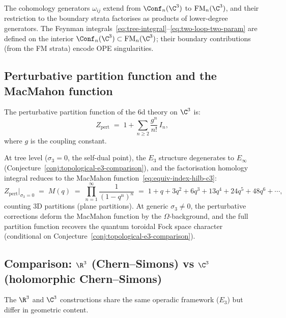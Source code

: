 The cohomology generators $\omega_{ij}$ extend from $\Conf_n(\C^3)$ to $\mathrm{FM}_n(\C^3)$, and their restriction to the boundary strata factorises as products of lower-degree generators. The Feynman integrals~\eqref{eq:tree-integral}--\eqref{eq:two-loop-two-param} are defined on the interior $\Conf_n(\C^3) \subset \mathrm{FM}_n(\C^3)$; their boundary contributions (from the FM strata) encode OPE singularities.


\subsection{Perturbative partition function and the MacMahon function}
\label{subsec:pert-part-fn}

The perturbative partition function of the $6$d theory on $\C^3$ is:
\begin{equation}\label{eq:z-pert-c3}
 Z_{\mathrm{pert}} \;=\; 1 + \sum_{n \geq 2} \frac{g^n}{n!} \, I_n,
\end{equation}
where $g$ is the coupling constant.

At tree level ($\sigma_3 = 0$, the self-dual point), the $E_3$ structure degenerates to $E_\infty$ (Conjecture~\ref{conj:topological-e3-comparison}), and the factorisation homology integral reduces to the MacMahon function~\eqref{eq:equiv-index-hilb-c3}:
\[
 Z_{\mathrm{pert}}\big|_{\sigma_3 = 0} \;=\; M(q)
 \;=\; \prod_{n=1}^{\infty} \frac{1}{(1 - q^n)^n}
 \;=\; 1 + q + 3q^2 + 6q^3 + 13q^4 + 24q^5 + 48q^6 + \cdots,
\]
counting $3$D partitions (plane partitions). At generic $\sigma_3 \neq 0$, the perturbative corrections deform the MacMahon function by the $\Omega$-background, and the full partition function recovers the quantum toroidal Fock space character (conditional on Conjecture~\ref{conj:topological-e3-comparison}).


\subsection{Comparison: \texorpdfstring{$\R^3$}{R-3} (Chern--Simons) vs \texorpdfstring{$\C^3$}{C-3} (holomorphic Chern--Simons)}
\label{subsec:r3-vs-c3}

The $\R^3$ and $\C^3$ constructions share the same operadic framework ($E_3$) but differ in geometric content.

